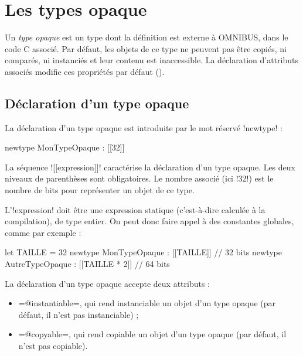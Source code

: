 




\chapter{Les types opaque}

Un \emph{type opaque} est un type dont la définition est externe à OMNIBUS, dans le code C associé. Par défaut, les objets de ce type ne peuvent pas être copiés, ni comparés, ni instanciés et leur contenu est inaccessible. La déclaration d'attributs associés modifie ces propriétés par défaut ().

\section{Déclaration d'un type opaque}

La déclaration d'un type opaque est introduite par le mot réservé \omnibus!newtype! :

\begin{OMNIBUS}
newtype MonTypeOpaque : [[32]]
\end{OMNIBUS}

La séquence \omnibus![[expression]]! caractérise la déclaration d'un type opaque. Les deux niveaux de parenthèses sont obligatoires. Le nombre associé (ici \omnibus!32!) est le nombre de bits pour représenter un objet de ce type.

L'\omnibus!expression! doit être une expression statique (c'est-à-dire calculée à la compilation), de type entier. On peut donc faire appel à des constantes globales, comme par exemple :

\begin{OMNIBUS}
let TAILLE = 32
newtype MonTypeOpaque : [[TAILLE]] // 32 bits
newtype AutreTypeOpaque : [[TAILLE * 2]] // 64 bits
\end{OMNIBUS}






La déclaration d'un type opaque accepte deux attributs :
\begin{itemize}
\item \omnibus=@instantiable=, qui rend instanciable un objet d'un type opaque (par défaut, il n'est pas instanciable) ;
\item \omnibus=@copyable=, qui rend copiable un objet d'un type opaque (par défaut, il n'est pas copiable).
\end{itemize}

